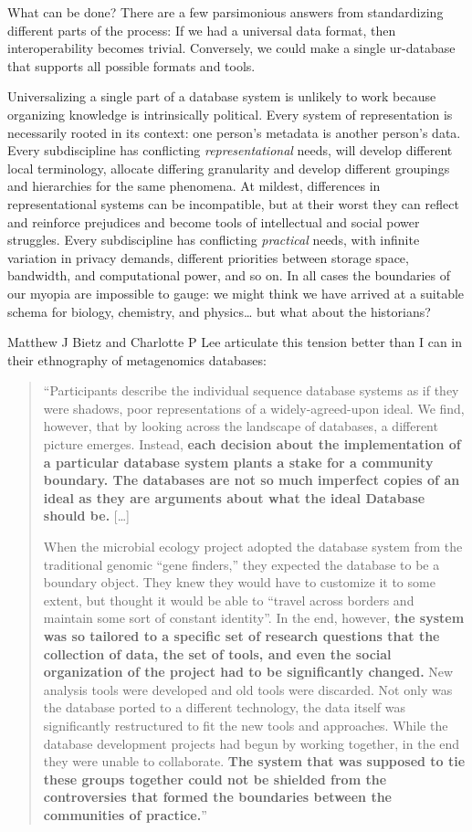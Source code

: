 \documentclass[10pt]{tufte-book}
\begin{document}
What can be done? There are a few parsimonious answers from
standardizing different parts of the process: If we had a universal data
format, then interoperability becomes trivial. Conversely, we could make
a single ur-database that supports all possible formats and tools.

Universalizing a single part of a database system is unlikely to work
because organizing knowledge is intrinsically political. Every system of
representation is necessarily rooted in its context: one person's
metadata is another person's data. Every subdiscipline has conflicting
\emph{representational} needs, will develop different local terminology,
allocate differing granularity and develop different groupings and
hierarchies for the same phenomena. At mildest, differences in
representational systems can be incompatible, but at their worst they
can reflect and reinforce prejudices and become tools of intellectual
and social power struggles. Every subdiscipline has conflicting
\emph{practical} needs, with infinite variation in privacy demands,
different priorities between storage space, bandwidth, and computational
power, and so on. In all cases the boundaries of our myopia are
impossible to gauge: we might think we have arrived at a suitable schema
for biology, chemistry, and physics\ldots{} but what about the
historians?

Matthew J Bietz and Charlotte P Lee articulate this tension better than
I can in their ethnography of metagenomics databases:

\begin{quote}
``Participants describe the individual sequence database systems as if
they were shadows, poor representations of a widely-agreed-upon ideal.
We find, however, that by looking across the landscape of databases, a
different picture emerges. Instead, \textbf{each decision about the
implementation of a particular database system plants a stake for a
community boundary. The databases are not so much imperfect copies of an
ideal as they are arguments about what the ideal Database should be.}
{[}\ldots{]}

When the microbial ecology project adopted the database system from the
traditional genomic ``gene finders,'' they expected the database to be a
boundary object. They knew they would have to customize it to some
extent, but thought it would be able to ``travel across borders and
maintain some sort of constant identity''. In the end, however,
\textbf{the system was so tailored to a specific set of research
questions that the collection of data, the set of tools, and even the
social organization of the project had to be significantly changed.} New
analysis tools were developed and old tools were discarded. Not only was
the database ported to a different technology, the data itself was
significantly restructured to fit the new tools and approaches. While
the database development projects had begun by working together, in the
end they were unable to collaborate. \textbf{The system that was
supposed to tie these groups together could not be shielded from the
controversies that formed the boundaries between the communities of
practice.}'' \citep{bietzCollaborationMetagenomicsSequence2009} 
\end{quote}
\end{document}
